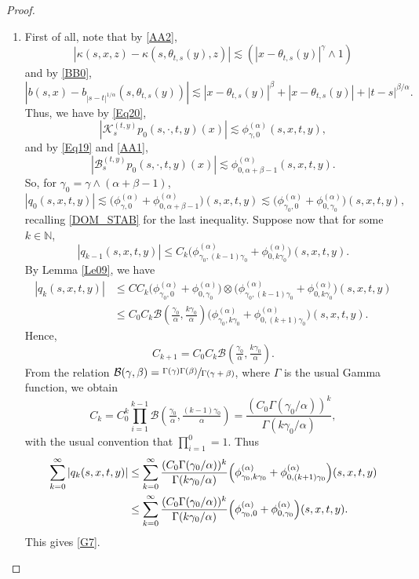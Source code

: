 \documentclass[11pt]{article}
\newcommand{\skpt}{\smallskip}
\numberwithin{equation}{section}\providecommand{\asymp}{\mathrel{\sim}}
\theoremstyle{plain}
\theoremstyle{definition}
\newcommand\cB{{\mathcal B}}
\newcommand\mN{\mathbb{N}}
\newcommand\1{{\mathbf{1}}}
\newcommand\sB{{\mathscr B}}
\newcommand\sK{{\mathscr K}}
\begin{document}
\skpt
\begin{proof}
\begin{enumerate}
\item\label{pf:Le31i}
First of all, note that by \eqref{AA2},
\begin{equation*}
|\kappa(s,x,z)-\kappa(s, \theta_{t,s}(y),z)|\lesssim (|x-\theta_{t,s}(y)|^{\gamma}\wedge 1)
\end{equation*}
and by \eqref{BB0},
\begin{equation*}
|b(s,x)-b_{|s-t|^{1/\alpha}}(s, \theta_{t,s}(y))|
\lesssim |x-\theta_{t,s}(y)|^\beta+|x-\theta_{t,s}(y)|+|t-s|^{\beta/\alpha}.
\end{equation*}
Thus, we have by \eqref{Eq20},
\begin{equation*}
|\sK^{(t,y)}_{s}p_0(s,\cdot,t,y)(x)|\lesssim \phi^{(\alpha)}_{\gamma,0}(s,x,t,y),
\end{equation*}
and by \eqref{Eq19} and \eqref{AA1},
\begin{equation*}
|\sB^{(t,y)}_{s} p_0(s,\cdot,t,y)(x)|\lesssim \phi^{(\alpha)}_{0,\alpha+\beta-1}(s,x,t,y).
\end{equation*}
So, for $\gamma_0=\gamma\wedge(\alpha+\beta-1)$,
\begin{equation*}
|q_0(s,x,t,y)|\lesssim\bigl(\phi^{(\alpha)}_{\gamma,0}+\phi^{(\alpha)}_{0,\alpha+\beta-1}\bigr)(s,x,t,y)
\lesssim\bigl(\phi^{(\alpha)}_{\gamma_0,0}+\phi^{(\alpha)}_{0,\gamma_0}\bigr)(s,x,t,y),
\end{equation*}
{recalling \eqref{DOM_STAB} for the last inequality.}
Suppose now that for some $k\in\mN$,
\[
|q_{k-1}(s,x,t,y)|\leq C_k\bigl(\phi^{(\alpha)}_{\gamma_0,(k-1)\gamma_0}+\phi^{(\alpha)}_{0,k\gamma_0}\bigr)(s,x,t,y).
\]
By Lemma \ref{Le09}, we have
\begin{align*}
|q_{k}(s,x,t,y)|
&\leq C C_k\bigl(\phi^{(\alpha)}_{\gamma_0,0}+\phi^{(\alpha)}_{0,\gamma_0}\bigr)\otimes
\bigl(\phi^{(\alpha)}_{\gamma_0,(k-1)\gamma_0}+\phi^{(\alpha)}_{0,k\gamma_0}\bigr)(s,x,t,y)
\\
&\leq C_0C_k\cB(\tfrac{\gamma_0}{\alpha},\tfrac{k\gamma_0}{\alpha})
\bigl(\phi^{(\alpha)}_{\gamma_0,k\gamma_0}+\phi^{(\alpha)}_{0,(k+1)\gamma_0}\bigr)(s,x,t,y).%
\end{align*}
Hence,
\[
C_{k+1}=C_0C_k\cB(\tfrac{\gamma_0}{\alpha},\tfrac{k\gamma_0}{\alpha}).
\]
From the relation $\cB(\gamma,\beta)=\sfrac{\Gamma(\gamma)\Gamma(\beta)}{\Gamma(\gamma+\beta)}$, where $\Gamma$
is the usual Gamma function, we obtain
\[
C_k=C^k_0\prod_{i=1}^{k-1}\cB(\tfrac{\gamma_0}{\alpha},\tfrac{(k-1)\gamma_0}{\alpha})
=\frac{(C_0\Gamma(\gamma_0/\alpha))^k}{\Gamma(k\gamma_0/\alpha)},
\]
with the usual convention that $\prod_{i=1}^{0}=1 $.
Thus
\begin{align*}
\sum_{k=0}^\infty |q_k(s,x,t,y)|
&\leq \sum_{k=0}^\infty\frac{(C_0\Gamma(\gamma_0/\alpha))^k}{\Gamma(k\gamma_0/\alpha)}
\Bigl(\phi^{(\alpha)}_{\gamma_0,k\gamma_0}+\phi^{(\alpha)}_{0,(k+1)\gamma_0}\Bigr)(s,x,t,y)
\\&\leq \sum_{k=0}^\infty\frac{(C_0\Gamma(\gamma_0/\alpha))^k}{\Gamma(k\gamma_0/\alpha)}
\Bigl(\phi^{(\alpha)}_{\gamma_0,0}+\phi^{(\alpha)}_{0,\gamma_0}\Bigr)(s,x,t,y).
\end{align*}
This gives \eqref{G7}.


\end{enumerate}
\end{proof}
\end{document}
